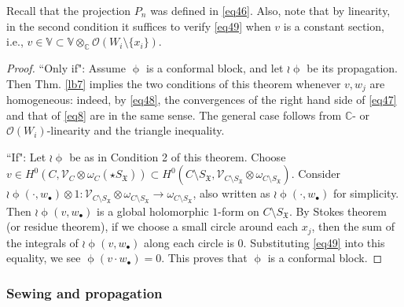 \documentclass[11pt,b5paper,notitlepage]{article}
\theoremstyle{definition}
\theoremstyle{plain}
\newcommand{\fk}{\mathfrak}
\newcommand{\scr}{\mathscr}
\newcommand{\SX}{{S_{\fk X}}}
\newcommand{\blt}{\bullet}
\newcommand{\Vbb}{\mathbb V}
\newcommand{\Cbb}{\mathbb C}
\numberwithin{equation}{subsection}
\begin{document}
Recall that the projection $P_n$ was defined in \eqref{eq46}. Also, note that by linearity, in the second condition it suffices to verify \eqref{eq49} when $v$ is a constant section, i.e., $v\in\Vbb\subset\Vbb\otimes_\Cbb\scr O(W_i\setminus\{x_i\})$.




\begin{proof}
``Only if": Assume $\upphi$ is a conformal block, and let $\wr\upphi$ be its propagation. Then Thm. \ref{lb7} implies the two conditions of this theorem  whenever $v,w_j$ are homogeneous: indeed, by \eqref{eq48}, the convergences of the right hand side of \eqref{eq47} and that of \eqref{eq8} are in the same sense. The general case follows from $\Cbb$- or $\scr O(W_i)$-linearity and the triangle inequality.

``If": Let $\wr\upphi$ be as in Condition 2 of this theorem. Choose $v\in H^0(C,\scr V_C\otimes\omega_C(\star\SX))\subset H^0(C\setminus\SX,\scr V_{C\setminus\SX}\otimes\omega_{C\setminus\SX})$. Consider $\wr\upphi(\cdot,w_\blt)\otimes 1:\scr V_{C\setminus\SX}\otimes\omega_{C\setminus\SX}\rightarrow \omega_{C\setminus\SX}$, also written as $\wr\upphi(\cdot,w_\blt)$ for simplicity. Then $\wr\upphi(v,w_\blt)$ is a global holomorphic $1$-form on $C\setminus\SX$. By Stokes theorem (or residue theorem), if we choose a small circle around each $x_j$, then the sum of the integrals of $\wr\upphi(v,w_\blt)$ along each circle is $0$. Substituting \eqref{eq49} into this equality, we see $\upphi(v\cdot w_\blt)=0$. This proves that $\upphi$ is a conformal block.
\end{proof}















\subsubsection{Sewing and propagation}\label{lb44}
\end{document}
